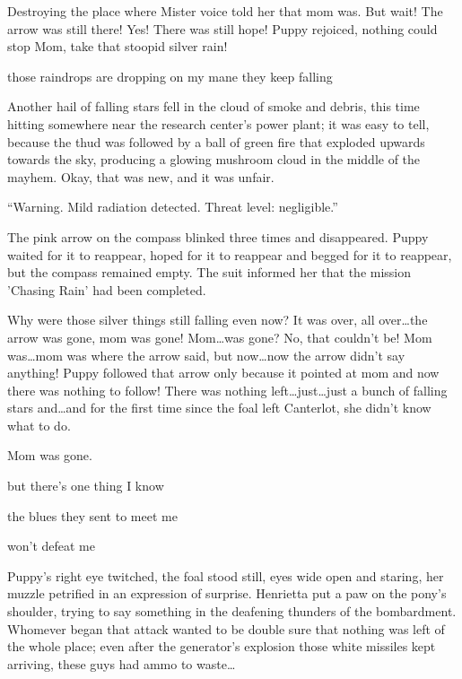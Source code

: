 Destroying the place where Mister voice told her that mom was. But wait! The arrow was still there! Yes! There was still hope! Puppy rejoiced, nothing could stop Mom, take that stoopid silver rain!

\begin{song}
    those raindrops are dropping on my mane they keep falling
\end{song}

Another hail of falling stars fell in the cloud of smoke and debris, this time hitting somewhere near the research center's power plant; it was easy to tell, because the thud was followed by a ball of green fire that exploded upwards towards the sky, producing a glowing mushroom cloud in the middle of the mayhem. Okay, that was new, and it was unfair.

``{\mt Warning. Mild radiation detected. Threat level: negligible.}''

The pink arrow on the compass blinked three times and disappeared. Puppy waited for it to reappear, hoped for it to reappear and begged for it to reappear, but the compass remained empty. The suit informed her that the mission 'Chasing Rain' had been completed.

Why were those silver things still falling even now? It was over, all over\dots the arrow was gone, mom was gone! Mom\dots was gone? No, that couldn't be! Mom was\dots mom was where the arrow said, but now\dots now the arrow didn't say anything! Puppy followed that arrow only because it pointed at mom and now there was nothing to follow! There was nothing left\dots just\dots just a bunch of falling stars and\dots and for the first time since the foal left Canterlot, she didn't know what to do.

Mom was gone.


\begin{song}
but there's one thing I know

the blues they sent to meet me

won't defeat me
\end{song}

Puppy's right eye twitched, the foal stood still, eyes wide open and staring, her muzzle petrified in an expression of surprise. Henrietta put a paw on the pony's shoulder, trying to say something in the deafening thunders of the bombardment. Whomever began that attack wanted to be double sure that nothing was left of the whole place; even after the generator's explosion those white missiles kept arriving, these guys had ammo to waste\dots

